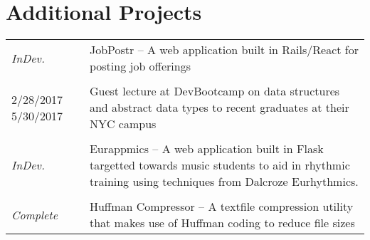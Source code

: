 \documentclass[a4paper,11pt]{article}
\begin{document}
\section{Additional Projects}
\begin{tabularx}{\textwidth}{@{}p{6em}|X@{}}
    \textit{InDev.} & JobPostr -- A web application built in Rails/React for posting job offerings \\
    \multicolumn{2}{c}{} \\
    2/28/2017 5/30/2017 & Guest lecture at DevBootcamp on data structures and abstract data types to recent graduates at their NYC campus \\
    \multicolumn{2}{c}{} \\
    \textit{InDev.} & Eurappmics -- A web application built in Flask targetted towards music students to aid in rhythmic training using techniques from Dalcroze Eurhythmics. \\
    \multicolumn{2}{c}{} \\
    \textit{Complete} & Huffman Compressor -- A textfile compression utility that makes use of Huffman coding to reduce file sizes
\end{tabularx}
\end{document}
